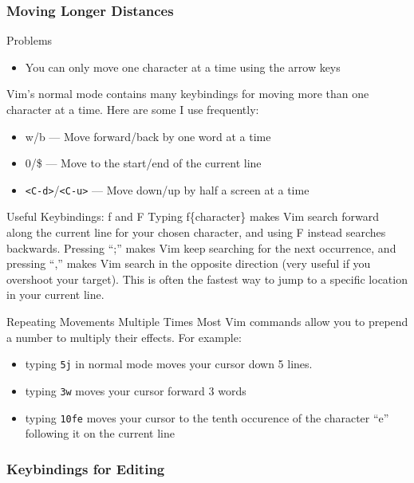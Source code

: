 \documentclass{beamer}
\begin{document}
\begin{frame}[fragile]
    \frametitle{Moving Longer Distances}
    \small
    \begin{block}{Problems}
	\begin{itemize}
	    \item You can only move one character at a time using the arrow keys
	\end{itemize}
    \end{block}
    Vim's normal mode contains many keybindings for moving more than one character at a time. Here are some I use frequently:
    \begin{itemize}
	\item w/b --- Move forward/back by one word at a time
	\item 0/\$ --- Move to the start/end of the current line
	\item \verb+<C-d>+/\verb+<C-u>+ --- Move down/up by half a screen at a time
    \end{itemize}
    \begin{block}{Useful Keybindings: f and F}
	Typing f\{character\} makes Vim search forward along the current line for your chosen character, and using F instead searches backwards. Pressing \enquote{;} makes Vim keep searching for the next occurrence, and pressing \enquote{,} makes Vim search in the opposite direction (very useful if you overshoot your target). This is often the fastest way to jump to a specific location in your current line.
    \end{block}
\end{frame}

\begin{frame}[fragile]
    \begin{block}{Repeating Movements Multiple Times}
	Most Vim commands allow you to prepend a number to multiply their effects. For example:
	\begin{itemize}
	    \item typing \verb+5j+ in normal mode moves your cursor down 5 lines.
	    \item typing \verb+3w+ moves your cursor forward 3 words
	    \item typing \verb+10fe+ moves your cursor to the tenth occurence of the character \enquote{e} following it on the current line
	\end{itemize}
    \end{block}
\end{frame}

\begin{frame}
    \frametitle{Keybindings for Editing}
\end{frame}
\end{document}
